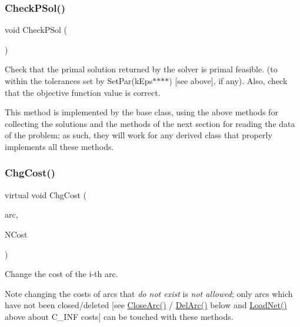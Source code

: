 \subsubsection{\texorpdfstring{Check\+P\+Sol()}{CheckPSol()}}
{\footnotesize\ttfamily void Check\+P\+Sol (\begin{DoxyParamCaption}\item[{void}]{ }\end{DoxyParamCaption})\hspace{0.3cm}{\ttfamily [inline]}}

Check that the primal solution returned by the solver is primal feasible. (to within the tolerances set by Set\+Par(k\+Eps$\ast$$\ast$$\ast$$\ast$) \mbox{[}see above\mbox{]}, if any). Also, check that the objective function value is correct.

This method is implemented by the base class, using the above methods for collecting the solutions and the methods of the next section for reading the data of the problem; as such, they will work for any derived class that properly implements all these methods. \mbox{\label{class_m_c_f_class_a41ab6d76a454b3f792665cce35a250f3}} 
\subsubsection{\texorpdfstring{Chg\+Cost()}{ChgCost()}}
{\footnotesize\ttfamily virtual void Chg\+Cost (\begin{DoxyParamCaption}\item[{\mbox{\hyperlink{class_m_c_f_class_ad53d6229d7ec28555a9c9c2fd9abf773}{Index}}}]{arc,  }\item[{\mbox{\hyperlink{class_m_c_f_class_a07dbefeeb08c3f63073622411893eb76}{c\+C\+Number}}}]{N\+Cost }\end{DoxyParamCaption})\hspace{0.3cm}{\ttfamily [pure virtual]}}

Change the cost of the i-\/th arc.

\begin{DoxyNote}{Note}
changing the costs of arcs that {\itshape do not exist} is {\itshape not allowed}; only arcs which have not been closed/deleted \mbox{[}see \mbox{\hyperlink{class_m_c_f_class_ae1c33ba491b57343fbc157123fff5b11}{Close\+Arc()}} / \mbox{\hyperlink{class_m_c_f_class_ae291d6625ff31a5fdcc1ef166e2dee34}{Del\+Arc()}} below and \mbox{\hyperlink{class_m_c_f_class_a8d82d26f7845eb69081c860e14c3dc4c}{Load\+Net()}} above about C\+\_\+\+I\+NF costs\mbox{]} can be touched with these methods. 
\end{DoxyNote}


